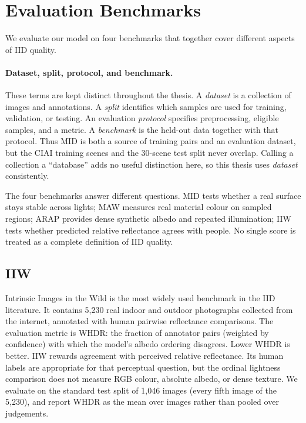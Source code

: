 \section{Evaluation Benchmarks}
\label{sec:benchmarks}

We evaluate our model on four benchmarks that together cover different aspects of IID
quality.

\paragraph{Dataset, split, protocol, and benchmark.}
These terms are kept distinct throughout the thesis. A \emph{dataset} is a
collection of images and annotations. A \emph{split} identifies which samples
are used for training, validation, or testing. An evaluation \emph{protocol}
specifies preprocessing, eligible samples, and a metric. A \emph{benchmark} is
the held-out data together with that protocol. Thus MID is both a source of
training pairs and an evaluation dataset, but the CIAI training scenes and the
30-scene test split never overlap. Calling a collection a ``database'' adds no
useful distinction here, so this thesis uses \emph{dataset} consistently.

The four benchmarks answer different questions. MID tests whether a real
surface stays stable across lights; MAW measures real material colour on sampled
regions; ARAP provides dense synthetic albedo and repeated illumination; IIW
tests whether predicted relative reflectance agrees with people. No single score
is treated as a complete definition of IID quality.

\subsection{IIW}

Intrinsic Images in the Wild  is the most widely used benchmark
in the IID literature.
It contains 5,230 real indoor and outdoor photographs collected from the internet,
annotated with human pairwise reflectance comparisons.
The evaluation metric is WHDR: the fraction of annotator pairs (weighted by
confidence) with which the model's albedo ordering disagrees.
Lower WHDR is better.
IIW rewards agreement with perceived relative reflectance. Its human labels are
appropriate for that perceptual question, but the ordinal lightness comparison
does not measure RGB colour, absolute albedo, or dense texture.
We evaluate on the standard test split of 1,046 images (every fifth image of the
5,230), and report WHDR as the mean over images rather than pooled over
judgements.


